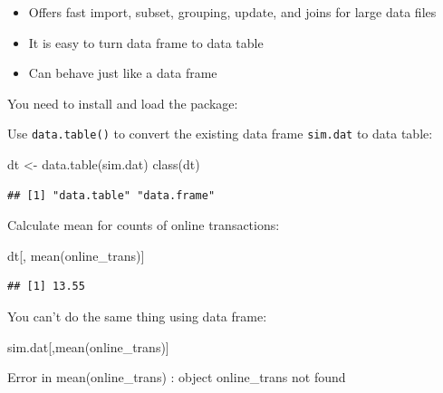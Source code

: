 \documentclass[
  12pt,
]{krantz}
\makeatletter
\newenvironment{Shaded}{\begin{snugshade}}{\end{snugshade}}
\newcommand{\FunctionTok}[1]{\textcolor[rgb]{0,0,0}{#1}}
\newcommand{\NormalTok}[1]{#1}
\newcommand{\OtherTok}[1]{\textcolor[rgb]{0.37,0.37,0.37}{#1}}
\providecommand{\tightlist}{%
  \setlength{\itemsep}{0pt}\setlength{\parskip}{0pt}}
\newenvironment{kframe}{%
\medskip{}
\setlength{\fboxsep}{.8em}
 \def\at@end@of@kframe{}%
 \ifinner\ifhmode%
  \def\at@end@of@kframe{\end{minipage}}%
  \begin{minipage}{\columnwidth}%
 \fi\fi%
 \def\FrameCommand##1{\hskip\@totalleftmargin \hskip-\fboxsep
 \colorbox{shadecolor}{##1}\hskip-\fboxsep
     \hskip-\linewidth \hskip-\@totalleftmargin \hskip\columnwidth}%
 \MakeFramed {\advance\hsize-\width
   \@totalleftmargin\z@ \linewidth\hsize
   \@setminipage}}%
 {\par\unskip\endMakeFramed%
 \at@end@of@kframe}
\renewenvironment{Shaded}{\begin{kframe}}{\end{kframe}}
\makeatother
\begin{document}
\begin{itemize}
\tightlist
\item
  Offers fast import, subset, grouping, update, and joins for large data files
\item
  It is easy to turn data frame to data table
\item
  Can behave just like a data frame
\end{itemize}

You need to install and load the package:

Use \texttt{data.table()} to convert the existing data frame \texttt{sim.dat} to data table:

\begin{Shaded}
\begin{Highlighting}[]
\NormalTok{dt }\OtherTok{\textless{}{-}} \FunctionTok{data.table}\NormalTok{(sim.dat)}
\FunctionTok{class}\NormalTok{(dt)}
\end{Highlighting}
\end{Shaded}

\begin{verbatim}
## [1] "data.table" "data.frame"
\end{verbatim}

Calculate mean for counts of online transactions:

\begin{Shaded}
\begin{Highlighting}[]
\NormalTok{dt[, }\FunctionTok{mean}\NormalTok{(online\_trans)]}
\end{Highlighting}
\end{Shaded}

\begin{verbatim}
## [1] 13.55
\end{verbatim}

You can't do the same thing using data frame:

\begin{Shaded}
\begin{Highlighting}[]
\NormalTok{sim.dat[,}\FunctionTok{mean}\NormalTok{(online\_trans)]}
\end{Highlighting}
\end{Shaded}

\begin{Shaded}
\begin{Highlighting}[]
\NormalTok{Error in mean(online\_trans) : object \textquotesingle{}online\_trans\textquotesingle{} not found}
\end{Highlighting}
\end{Shaded}
\end{document}
